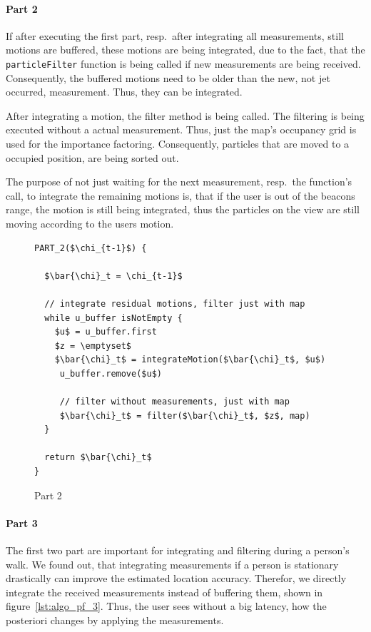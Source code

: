 \paragraph{Part 2} If after executing the first part, resp.\ after integrating all measurements, still motions are buffered, these motions are being integrated, due to the fact, that the \texttt{particleFilter} function is being called if new measurements are being received. Consequently, the buffered motions need to be older than the new, not jet occurred, measurement. Thus, they can be integrated.

After integrating a motion, the filter method is being called. The filtering is being executed without a actual measurement. Thus, just the map's occupancy grid is used for the importance factoring. Consequently, particles that are moved to a occupied position, are being sorted out.

The purpose of not just waiting for the next measurement, resp.\ the function's call, to integrate the remaining motions is, that if the user is out of the beacons range, the motion is still being integrated, thus the particles on the view are still moving according to the users motion.

\begin{figure}
\begin{lstlisting}[mathescape]
PART_2($\chi_{t-1}$) {

  $\bar{\chi}_t = \chi_{t-1}$

  // integrate residual motions, filter just with map
  while u_buffer isNotEmpty {
    $u$ = u_buffer.first
    $z = \emptyset$
    $\bar{\chi}_t$ = integrateMotion($\bar{\chi}_t$, $u$)
     u_buffer.remove($u$)
     
     // filter without measurements, just with map
     $\bar{\chi}_t$ = filter($\bar{\chi}_t$, $z$, map)
  }
  
  return $\bar{\chi}_t$
}
\end{lstlisting}
\caption{Part 2}
\label{lst:algo_pf_2}
\end{figure}

\paragraph{Part 3}The first two part are important for integrating and filtering during a person's walk. We found out, that integrating measurements if a person is stationary drastically can improve the estimated location accuracy. Therefor, we directly integrate the received measurements instead of buffering them, shown in figure~\ref{lst:algo_pf_3}. Thus, the user sees without a big latency, how the posteriori changes by applying the measurements.

